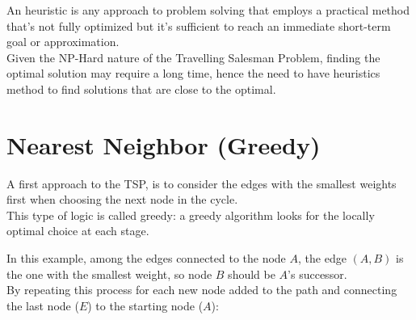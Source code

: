 An heuristic is any approach to problem solving that employs a practical method that's not fully optimized but it's sufficient to reach an immediate short-term goal or approximation.\\
Given the NP-Hard nature of the Travelling Salesman Problem, finding the optimal solution may require a long time, hence the need to have heuristics method to find solutions that are close to the optimal.

\section{Nearest Neighbor (Greedy)}
A first approach to the TSP, is to consider the edges with the smallest weights first when choosing the next node in the cycle.\\
This type of logic is called greedy: a greedy algorithm looks for the locally optimal choice at each stage.

\begin{center}
\end{center}

In this example, among the edges connected to the node $A$, the edge $(A, B)$ is the one with the smallest weight, so node $B$ should be $A$'s successor.\\

By repeating this process for each new node added to the path and connecting the last node ($E$) to the starting node ($A$):

